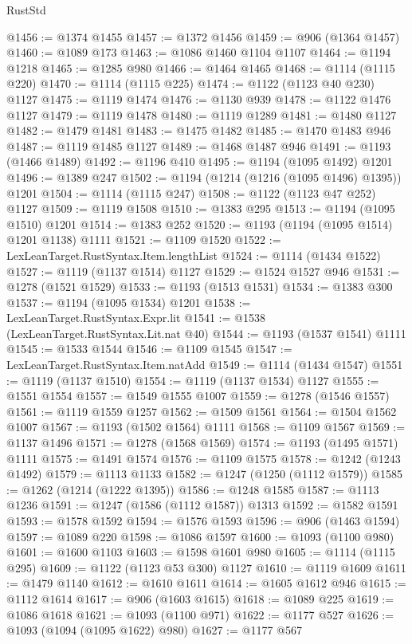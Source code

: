 \begin{lexlean}{RustStd}
\begin{coremodule}
@1456 := @1374 @1455
@1457 := @1372 @1456
@1459 := @906 (@1364 @1457)
@1460 := @1089 @173
@1463 := @1086 @1460 @1104 @1107
@1464 := @1194 @1218
@1465 := @1285 @980
@1466 := @1464 @1465
@1468 := @1114 (@1115 @220)
@1470 := @1114 (@1115 @225)
@1474 := @1122 (@1123 @40 @230) @1127
@1475 := @1119 @1474
@1476 := @1130 @939
@1478 := @1122 @1476 @1127
@1479 := @1119 @1478
@1480 := @1119 @1289
@1481 := @1480 @1127
@1482 := @1479 @1481
@1483 := @1475 @1482
@1485 := @1470 @1483 @946
@1487 := @1119 @1485 @1127
@1489 := @1468 @1487 @946
@1491 := @1193 (@1466 @1489)
@1492 := @1196 @410
@1495 := @1194 (@1095 @1492) @1201
@1496 := @1389 @247
@1502 := @1194 (@1214 (@1216 (@1095 @1496) @1395)) @1201
@1504 := @1114 (@1115 @247)
@1508 := @1122 (@1123 @47 @252) @1127
@1509 := @1119 @1508
@1510 := @1383 @295
@1513 := @1194 (@1095 @1510) @1201
@1514 := @1383 @252
@1520 := @1193 (@1194 (@1095 @1514) @1201 @1138) @1111
@1521 := @1109 @1520
@1522 := LexLeanTarget.RustSyntax.Item.lengthList
@1524 := @1114 (@1434 @1522)
@1527 := @1119 (@1137 @1514) @1127
@1529 := @1524 @1527 @946
@1531 := @1278 (@1521 @1529)
@1533 := @1193 (@1513 @1531)
@1534 := @1383 @300
@1537 := @1194 (@1095 @1534) @1201
@1538 := LexLeanTarget.RustSyntax.Expr.lit
@1541 := @1538 (LexLeanTarget.RustSyntax.Lit.nat @40)
@1544 := @1193 (@1537 @1541) @1111
@1545 := @1533 @1544
@1546 := @1109 @1545
@1547 := LexLeanTarget.RustSyntax.Item.natAdd
@1549 := @1114 (@1434 @1547)
@1551 := @1119 (@1137 @1510)
@1554 := @1119 (@1137 @1534) @1127
@1555 := @1551 @1554
@1557 := @1549 @1555 @1007
@1559 := @1278 (@1546 @1557)
@1561 := @1119 @1559 @1257
@1562 := @1509 @1561
@1564 := @1504 @1562 @1007
@1567 := @1193 (@1502 @1564) @1111
@1568 := @1109 @1567
@1569 := @1137 @1496
@1571 := @1278 (@1568 @1569)
@1574 := @1193 (@1495 @1571) @1111
@1575 := @1491 @1574
@1576 := @1109 @1575
@1578 := @1242 (@1243 @1492)
@1579 := @1113 @1133
@1582 := @1247 (@1250 (@1112 @1579))
@1585 := @1262 (@1214 (@1222 @1395))
@1586 := @1248 @1585
@1587 := @1113 @1236
@1591 := @1247 (@1586 (@1112 @1587)) @1313
@1592 := @1582 @1591
@1593 := @1578 @1592
@1594 := @1576 @1593
@1596 := @906 (@1463 @1594)
@1597 := @1089 @220
@1598 := @1086 @1597
@1600 := @1093 (@1100 @980)
@1601 := @1600 @1103
@1603 := @1598 @1601 @980
@1605 := @1114 (@1115 @295)
@1609 := @1122 (@1123 @53 @300) @1127
@1610 := @1119 @1609
@1611 := @1479 @1140
@1612 := @1610 @1611
@1614 := @1605 @1612 @946
@1615 := @1112 @1614
@1617 := @906 (@1603 @1615)
@1618 := @1089 @225
@1619 := @1086 @1618
@1621 := @1093 (@1100 @971)
@1622 := @1177 @527
@1626 := @1093 (@1094 (@1095 @1622) @980)
@1627 := @1177 @567

\end{coremodule}
\end{lexlean}
